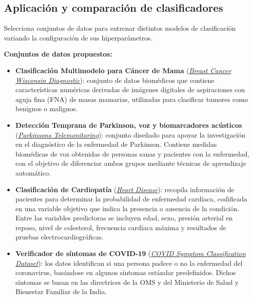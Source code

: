 \subsection{Aplicación y comparación de clasificadores}

Selecciona conjuntos de datos para entrenar distintos modelos de
clasificación variando la configuración de sus hiperparámetros.

\textbf{Conjuntos de datos propuestos:}

\begin{itemize}
    \item \textbf{Clasificación Multimodelo para Cáncer de Mama}
          (\href{https://archive.ics.uci.edu/dataset/17/breast+cancer+wisconsin+diagnostic}{\textit{Breast Cancer Wisconsin Diagnostic}}):
          conjunto de datos biomédicos que contiene características numéricas
          derivadas de imágenes digitales de aspiraciones con aguja fina (FNA)
          de masas mamarias, utilizadas para clasificar tumores como benignos
          o malignos.
    \item \textbf{Detección Temprana de Parkinson, voz y biomarcadores acústicos}
          (\href{https://archive.ics.uci.edu/dataset/189/parkinsons+telemonitoring}{\textit{Parkinsons Telemonitoring}}):
          conjunto diseñado para apoyar la investigación en el diagnóstico de
          la enfermedad de Parkinson. Contiene medidas biomédicas de voz
          obtenidas de personas sanas y pacientes con la enfermedad, con el
          objetivo de diferenciar ambos grupos mediante técnicas de aprendizaje
          automático.
    \item \textbf{Clasificación de Cardiopatía}
          (\href{https://archive.ics.uci.edu/dataset/45/heart+disease}{\textit{Heart Disease}}):
          recopila información de pacientes para determinar la probabilidad de
          enfermedad cardíaca, codificada en una variable objetivo que indica
          la presencia o ausencia de la condición. Entre las variables
          predictoras se incluyen edad, sexo, presión arterial en reposo, nivel
          de colesterol, frecuencia cardíaca máxima y resultados de pruebas
          electrocardiográficas.
    \item \textbf{Verificador de síntomas de COVID-19}
          (\href{https://www.kaggle.com/datasets/iamhungundji/covid19-symptoms-checker}{\textit{COVID Symptom Classification Dataset}}):
          los datos identifican si una persona padece o no la enfermedad del
          coronavirus, basándose en algunos síntomas estándar predefinidos.
          Dichos síntomas se basan en las directrices de la OMS y del
          Ministerio de Salud y Bienestar Familiar de la India.
\end{itemize}

